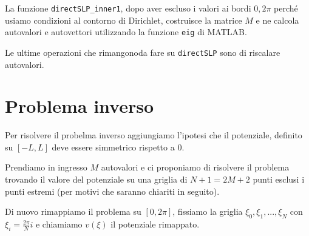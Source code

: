 \documentclass[a4paper,10pt]{article}
\theoremstyle{plain}
\theoremstyle{definition}
\theoremstyle{remark}
\begin{document}
La funzione \lstinline{directSLP_inner1}, dopo aver escluso i valori
ai bordi $0,2\pi$ perché usiamo condizioni al contorno di Dirichlet,
costruisce la matrice $M$ e ne calcola autovalori e autovettori
utilizzando la funzione \lstinline{eig} di MATLAB.

Le ultime operazioni che rimangonoda fare su \lstinline{directSLP}
sono di riscalare autovalori.


\section{Problema inverso}

Per risolvere il probelma inverso aggiungiamo l'ipotesi che il
potenziale, definito su $[-L,L]$ deve essere simmetrico rispetto a
$0$. 

Prendiamo in ingresso $M$ autovalori e ci proponiamo di risolvere il
problema trovando il valore del potenziale su una griglia di $N +1 =
2M+2$ punti esclusi i punti estremi (per motivi che saranno chiariti
in seguito).

Di nuovo rimappiamo il problema su $[0,2\pi]$, fissiamo la griglia
$\xi _0, \xi _1, ..., \xi _N$ con $\xi _i = \frac{2\pi}{N}i$ e
chiamiamo $v(\xi)$ il potenziale rimappato.
\end{document}
